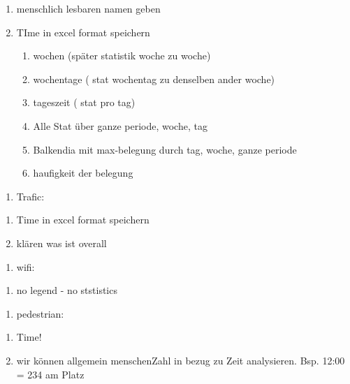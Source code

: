 \documentclass[11pt]{article}
\providecommand{\tightlist}{%
      \setlength{\itemsep}{0pt}\setlength{\parskip}{0pt}}
\begin{document}
\begin{enumerate}
\def\labelenumi{\roman{enumi}.}
\tightlist
\item
  menschlich lesbaren namen geben
\item
  TIme in excel format speichern

  \begin{enumerate}
  \def\labelenumii{\alph{enumii}.}
  \tightlist
  \item
    wochen (später statistik woche zu woche)
  \item
    wochentage ( stat wochentag zu denselben ander woche)
  \item
    tageszeit ( stat pro tag)
  \item
    Alle Stat über ganze periode, woche, tag
  \item
    Balkendia mit max-belegung durch tag, woche, ganze periode
  \item
    haufigkeit der belegung
  \end{enumerate}
\end{enumerate}

\begin{enumerate}
\def\labelenumi{\arabic{enumi}.}
\setcounter{enumi}{1}
\tightlist
\item
  Trafic:
\end{enumerate}

\begin{enumerate}
\def\labelenumi{\roman{enumi}.}
\tightlist
\item
  Time in excel format speichern
\item
  klären was ist overall
\end{enumerate}

\begin{enumerate}
\def\labelenumi{\arabic{enumi}.}
\setcounter{enumi}{2}
\tightlist
\item
  wifi:
\end{enumerate}

\begin{enumerate}
\def\labelenumi{\roman{enumi}.}
\tightlist
\item
  no legend - no ststistics
\end{enumerate}

\begin{enumerate}
\def\labelenumi{\arabic{enumi}.}
\setcounter{enumi}{3}
\tightlist
\item
  pedestrian:
\end{enumerate}

\begin{enumerate}
\def\labelenumi{\roman{enumi}.}
\tightlist
\item
  Time!
\item
  wir können allgemein menschenZahl in bezug zu Zeit analysieren. Bsp.
  12:00 = 234 am Platz
\end{enumerate}
\end{document}
